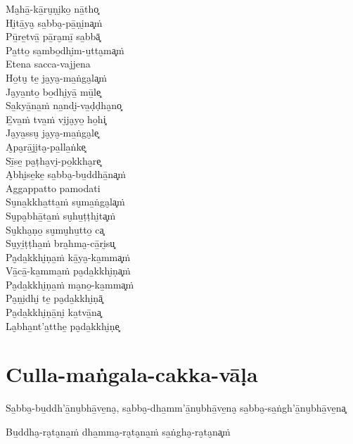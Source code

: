 \begin{paritta}

Ma̮hā̱-kā̱ru̮ṇi̮ko̱ nā̱tho͓\\
Hi̮tā̱ya̮ sa̱bba̮-pā̱ṇi̮na͓ṁ\\
Pū̱re̱tvā̱ pā̱ra̮mī̱ sa̱bbā͓\\
Pa̱tto̱ sa̱mbo̱dhi̮m-u̱tta̮ma͓ṁ\\
Etena sacca-vajjena\\
Ho̱tu̮ te̱ ja̮ya̮-ma̱ṅga̮la͓ṁ\\
Ja̮ya̱nto̱ bo̱dhi̮yā̱ mū̱le͓\\
Sa̱kyā̱na̱ṁ na̱ndi̮-va̱ḍḍha̮no͓\\
E̱va̱ṁ tva̱ṁ vi̮ja̮yo̱ ho̱hi͓\\
Ja̮ya̱ssu̮ ja̮ya̮-ma̱ṅga̮le͓\\
A̮pa̮rā̱ji̮ta̮-pa̱lla̱ṅke͓\\
Sī̱se̱ pa̮ṭha̮vi̮-po̱kkha̮re͓\\
A̮bhi̮se̱ke̱ sa̱bba̮-bu̱ddhā̱na͓ṁ\\
Aggappatto pamodati\\
Su̮na̱kkha̱tta̱ṁ su̮ma̱ṅga̮la͓ṁ\\
Su̮pa̮bhā̱ta̱ṁ su̮hu̱ṭṭhi̮ta͓ṁ\\
Su̮kha̮ṇo̱ su̮mu̮hu̱tto̱ ca͓\\
Su̮yi̱ṭṭha̱ṁ bra̱hma̮-cā̱ri̮su͓\\
Pa̮da̱kkhi̮ṇa̱ṁ kā̱ya̮-ka̱mma͓ṁ\\
Vā̱cā̱-ka̱mma̱ṁ pa̮da̱kkhi̮ṇa͓ṁ\\
Pa̮da̱kkhi̮ṇa̱ṁ ma̮no̱-ka̱mma͓ṁ\\
Pa̮ṇi̮dhi̮ te̱ pa̮da̱kkhi̮ṇā͓\\
Pa̮da̱kkhi̮ṇā̱ni̮ ka̱tvā̱na͓\\
La̮bha̱nt'a̱tthe̱ pa̮da̱kkhi̮ṇe͓


\end{paritta}

\clearpage

\chapter{Culla-maṅgala-cakka-vāḷa}


Sa̱bba̮-bu̱ddh'ā̱nu̮bhā̱ve̱na̮, sa̱bba̮-dha̱mm'ā̱nu̮bhā̱ve̱na̮ sa̱bba̮-sa̱ṅgh'ā̱nu̮bhā̱ve̱na͓

Bu̱ddha̮-ra̮ta̮na̱ṁ dha̱mma̮-ra̮ta̮na̱ṁ sa̱ṅgha̮-ra̮ta̮na͓ṁ

